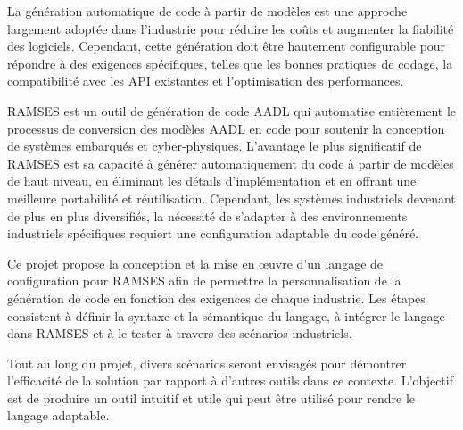 
%

La génération automatique de code à partir de modèles est une approche largement adoptée dans l'industrie pour réduire les coûts et augmenter la fiabilité des logiciels. Cependant, cette génération doit être hautement configurable pour répondre à des exigences spécifiques, telles que les bonnes pratiques de codage, la compatibilité avec les API existantes et l'optimisation des performances.

RAMSES est un outil de génération de code AADL qui automatise entièrement le processus de conversion des modèles AADL en code pour soutenir la conception de systèmes embarqués et cyber-physiques. L'avantage le plus significatif de RAMSES est sa capacité à générer automatiquement du code à partir de modèles de haut niveau, en éliminant les détails d'implémentation et en offrant une meilleure portabilité et réutilisation. Cependant, les systèmes industriels devenant de plus en plus diversifiés, la nécessité de s'adapter à des environnements industriels spécifiques requiert une configuration adaptable du code généré.

Ce projet propose la conception et la mise en œuvre d'un langage de configuration pour RAMSES afin de permettre la personnalisation de la génération de code en fonction des exigences de chaque industrie. Les étapes consistent à définir la syntaxe et la sémantique du langage, à intégrer le langage dans RAMSES et à le tester à travers des scénarios industriels.

Tout au long du projet, divers scénarios seront envisagés pour démontrer l'efficacité de la solution par rapport à d'autres outils dans ce contexte. L'objectif est de produire un outil intuitif et utile qui peut être utilisé pour rendre le langage adaptable.

